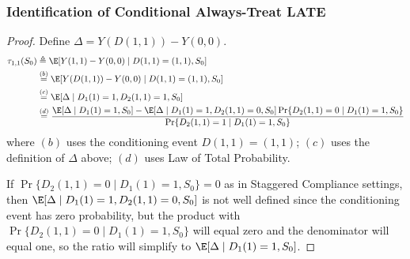\subsubsection{Identification of Conditional Always-Treat LATE}
\begin{proof}
Define $\Delta = Y(D(1,1)) - Y(0,0)$.
\begin{align}
\tau_{1,1}(S_0)
&\triangleq \E[ Y(1,1) - Y(0,0) \mid D(1,1)=(1,1), S_0 ]        \nonumber \\
&\stackrel{(b)}{=} \E[ Y(D(1,1)) - Y(0,0) \mid D(1, 1)=(1, 1), S_0 ]  \nonumber \\
&\stackrel{(c)}{=} \E[ \Delta \mid D_1(1)=1, D_2(1,1)=1, S_0 ]  \nonumber \\
&\stackrel{(d)}{=} \frac{
    \E[ \Delta \mid D_1(1)=1, S_0 ]
    - \E[\Delta \mid D_1(1)=1, D_2(1,1)=0, S_0]
       \Pr\{ D_2(1,1)=0 \mid D_1(1)=1, S_0 \}
  }{ \Pr\{ D_2(1,1)=1 \mid D_1(1)=1, S_0 \} } \label{eqn:initial-formula}
\end{align}
where
  $(b)$  uses the conditioning event $D(1,1)=(1,1)$; 
  $(c)$ uses the definition of $\Delta$ above; 
  $(d)$ uses Law of Total Probability.

If $\Pr\{D_2(1,1)=0 \mid D_1(1)=1, S_0\}=0$ as in Staggered Compliance settings, then $\E[\Delta \mid D_1(1)=1, D_2(1,1)=0, S_0]$ is not well defined since the conditioning event has zero probability, but the product with $\Pr\{D_2(1,1)=0 \mid D_1(1)=1, S_0\}$ will equal zero and the denominator will equal one, so the ratio will simplify to 
$\E[ \Delta \mid D_1(1)=1, S_0 ]$.


\end{proof}
